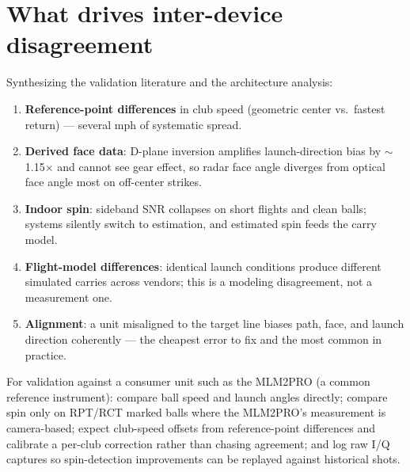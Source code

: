 \section{What drives inter-device disagreement}

Synthesizing the validation literature and the architecture analysis:

\begin{enumerate}
\item \textbf{Reference-point differences} in club speed (geometric
center vs.\ fastest return) --- several mph of systematic spread.
\item \textbf{Derived face data}: D-plane inversion amplifies
launch-direction bias by $\sim$1.15$\times$ and cannot see gear effect,
so radar face angle diverges from optical face angle most on off-center
strikes.
\item \textbf{Indoor spin}: sideband SNR collapses on short flights and
clean balls; systems silently switch to estimation, and estimated spin
feeds the carry model.
\item \textbf{Flight-model differences}: identical launch conditions
produce different simulated carries across vendors; this is a modeling
disagreement, not a measurement one.
\item \textbf{Alignment}: a unit misaligned to the target line biases
path, face, and launch direction coherently --- the cheapest error to fix
and the most common in practice.
\end{enumerate}

\begin{implication}
For validation against a consumer unit such as the MLM2PRO (a common reference
instrument): compare ball speed and launch angles directly; compare spin
only on RPT/RCT marked balls where the MLM2PRO's measurement is
camera-based; expect club-speed offsets from reference-point differences
and calibrate a per-club correction rather than chasing agreement; and
log raw I/Q captures so spin-detection improvements can be replayed
against historical shots.
\end{implication}
